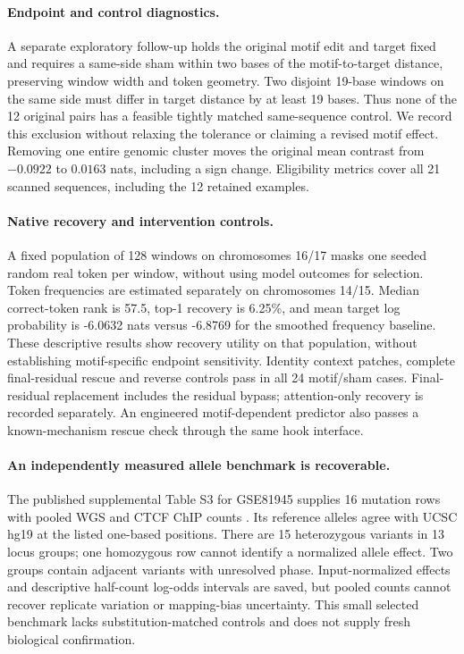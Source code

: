 \paragraph{Endpoint and control diagnostics.}
A separate exploratory follow-up holds the original motif edit and target fixed and requires a same-side sham within two bases of the motif-to-target distance, preserving window width and token geometry. Two disjoint 19-base windows on the same side must differ in target distance by at least 19 bases. Thus none of the 12 original pairs has a feasible tightly matched same-sequence control. We record this exclusion without relaxing the tolerance or claiming a revised motif effect. Removing one entire genomic cluster moves the original mean contrast from $-0.0922$ to $0.0163$ nats, including a sign change. Eligibility metrics cover all 21 scanned sequences, including the 12 retained examples.

\paragraph{Native recovery and intervention controls.}
A fixed population of 128 windows on chromosomes 16/17 masks one seeded random real token per window, without using model outcomes for selection. Token frequencies are estimated separately on chromosomes 14/15. Median correct-token rank is 57.5, top-1 recovery is 6.25\%, and mean target log probability is -6.0632 nats versus -6.8769 for the smoothed frequency baseline. These descriptive results show recovery utility on that population, without establishing motif-specific endpoint sensitivity. Identity context patches, complete final-residual rescue and reverse controls pass in all 24 motif/sham cases. Final-residual replacement includes the residual bypass; attention-only recovery is recorded separately. An engineered motif-dependent predictor also passes a known-mechanism rescue check through the same hook interface.

\paragraph{An independently measured allele benchmark is recoverable.}
The published supplemental Table S3 for GSE81945 supplies 16 mutation rows with pooled WGS and CTCF ChIP counts \citep{poulos2016ctcf}. Its reference alleles agree with UCSC hg19 at the listed one-based positions. There are 15 heterozygous variants in 13 locus groups; one homozygous row cannot identify a normalized allele effect. Two groups contain adjacent variants with unresolved phase. Input-normalized effects and descriptive half-count log-odds intervals are saved, but pooled counts cannot recover replicate variation or mapping-bias uncertainty. This small selected benchmark lacks substitution-matched controls and does not supply fresh biological confirmation.
